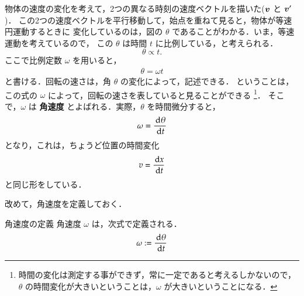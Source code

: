                 物体の速度の変化を考えて，2つの異なる時刻の速度ベクトルを描いた($\boldsymbol{v}$ と $\boldsymbol{v}'$)．
                この2つの速度ベクトルを平行移動して，始点を重ねて見ると，物体が等速円運動するときに
                変化しているのは，図の $\theta$ であることがわかる．いま，等速運動を考えているので，
                この $\theta$ は時間 $t$ に比例している，と考えられる．
                    \begin{equation*}
                        \theta \propto t.
                    \end{equation*}
                ここで比例定数 $\omega$ を用いると，
                    \begin{align}
                        \theta = \omega t
                    \end{align}
                と書ける．回転の速さは，角 $\theta$ の変化によって，記述できる．
                ということは，
                この式の $\omega$ によって，回転の速さを表していると見ることができる
                    \footnote{
                        時間の変化は測定する事ができず，常に一定であると考えるしかないので，
                        $\theta$ の時間変化が大きいということは，$\omega$ が大きいということになる．
                    }．
                そこで，$\omega$ は \textbf{角速度} とよばれる．実際，$\theta$ を時間微分すると，
                    \begin{align}
                        \omega = \frac{\,\mathrm{d} \theta}{\,\mathrm{d} t}
                    \end{align}
                となり，これは，ちょうど位置の時間変化
                    \begin{equation*}
                        v = \frac{\,\mathrm{d} x}{\,\mathrm{d} t}
                    \end{equation*}
                と同じ形をしている．

                改めて，角速度を定義しておく．
                    \begin{myshadebox}{角速度の定義}
                        角速度 $\omega$ は，次式で定義される．
                        \begin{align}
                            \omega := \frac{\,\mathrm{d} \theta}{\,\mathrm{d} t}
                        \end{align}
                    \end{myshadebox}

